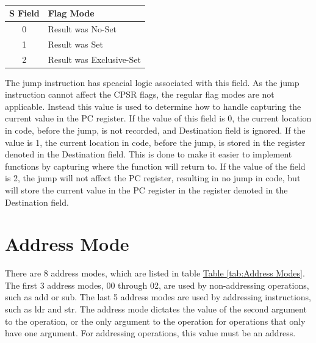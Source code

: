 \documentclass[12pt]{article}
\begin{document}
\begin{table}[h!]
    \centering
    \caption{}
    \label{tab:S Field Values}
    \begin{tabular}{|c|l|}
        \hline
        \textbf{S} Field & Flag Mode \\ \hline
        0 & Result was No-Set \\ \hline
        1 & Result was Set \\ \hline
        2 & Result was Exclusive-Set \\ \hline
    \end{tabular}
\end{table}

The jump instruction has speacial logic associated with this field. As the jump instruction cannot
affect the CPSR flags, the regular flag modes are not applicable. Instead this value is used to
determine how to handle capturing the current value in the PC register. If the value of this field
is 0, the current location in code, before the jump, is not recorded, and Destination field is
ignored. If the value is 1, the current location in code, before the jump, is stored in the register
denoted in the Destination field. This is done to make it easier to implement functions by capturing
where the function will return to. If the value of the field is 2, the jump will not affect the PC
register, resulting in no jump in code, but will store the current value in the PC register in
the register denoted in the Destination field.

\section{Address Mode} \label{sec:Address Mode}

There are 8 address modes, which are listed in table
\hyperref[tab:Address Modes]{Table \ref{tab:Address Modes}}. The first 3 address modes, 00 through 02,
are used by non-addressing operations, such as add or sub. The last 5 address modes are used by
addressing instructions, such as ldr and str. The address mode dictates the value of the
second argument to the operation, or the only argument to the operation for operations that
only have one argument. For addressing operations, this value must be an address.
\end{document}
